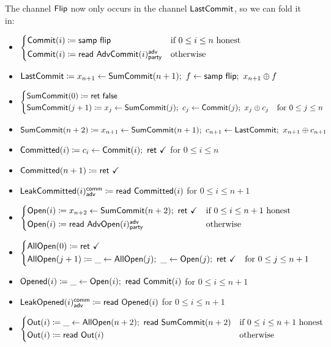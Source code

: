 \noindent The channel $\mathsf{Flip}$ now only occurs in the channel $\mathsf{LastCommit}$, so we can fold it in:

\begin{itemize}
\item {\color{blue} $\begin{cases*} \Commit(i) \coloneqq \samp{\flip} & \text{if $0 \leq i \leq n$ honest} \\ \Commit(i) \coloneqq \read{\AdvCommit(i)^\adv_\party} & \text{otherwise} \end{cases*}$}
\item {\color{blue} $\mathsf{LastCommit} \coloneqq x_{n+1} \leftarrow \mathsf{SumCommit}(n+1); \ f \leftarrow \mathsf{samp} \ \mathsf{flip}; \ x_{n+1} \oplus f$}
\item {\color{blue} $\begin{cases*} \SumCommit(0) \coloneqq \ret{\false} & \\ \SumCommit(j+1) \coloneqq x_j \leftarrow \SumCommit(j); \ c_j \leftarrow \Commit(j); \ x_j \oplus c_j & \text{for $0 \leq j \leq n$} \end{cases*}$}
\item {\color{blue} $\SumCommit(n+2) \coloneqq x_{n+1} \leftarrow \SumCommit(n+1); \ c_{n+1} \leftarrow \LastCommit; \ x_{n+1} \oplus c_{n+1}$}
\item {\color{magenta} $\mathsf{Committed}(i) \coloneqq c_i \leftarrow \mathsf{Commit}(i); \ \mathsf{ret} \ \checkmark$ for $0 \leq i \leq n$}
\item {\color{magenta} $\mathsf{Committed}(n+1) \coloneqq \mathsf{ret} \ \checkmark$}
\item {\color{magenta} $\mathsf{LeakCommitted}(i)^{\mathsf{comm}}_{\mathsf{adv}} \coloneqq \mathsf{read} \ \mathsf{Committed}(i)$ for $0 \leq i \leq n+1$}
\item {\color{teal} $\begin{cases*} \Open(i) \coloneqq x_{n+2} \leftarrow \SumCommit(n+2); \ \ret{\checkmark} & \text{if $0 \leq i \leq n+1$ honest} \\ \Open(i) \coloneqq \read{\AdvOpen(i)^\adv_\party} & \text{otherwise} \end{cases*}$}
\item {\color{teal} $\begin{cases*} \AllOpen(0) \coloneqq \ret{\checkmark} & \\ \AllOpen(j+1) \coloneqq \_ \leftarrow \AllOpen(j); \ \_ \leftarrow \Open(j); \ \ret{\checkmark} & \text{for $0 \leq j \leq n+1$} \end{cases*}$}
\item {\color{red} $\mathsf{Opened}(i) \coloneqq \_ \leftarrow \mathsf{Open}(i); \ \mathsf{read} \ \mathsf{Commit}(i)$ for $0 \leq i \leq n+1$}
\item {\color{red} $\mathsf{LeakOpened}(i)^{\mathsf{comm}}_{\mathsf{adv}} \coloneqq \mathsf{read} \ \mathsf{Opened}(i)$ for $0 \leq i \leq n+1$}
\item $\begin{cases*} \Out(i) \coloneqq \_ \leftarrow \AllOpen(n+2); \ \read{\SumCommit(n+2)} & \text{if $0 \leq i \leq n+1$ honest} \\ \Out(i) \coloneqq \read{\Out(i)} & \text{otherwise} \end{cases*}$
\end{itemize}

